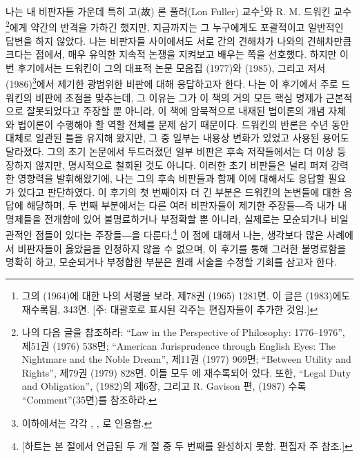 나는 내 비판자들 가운데 특히 고(故) 론 풀러(Lon Fuller)
교수\footnote{그의  (1964)에 대한 나의 서평을
  보라,  제78권 (1965) 1281면. 이 글은
   (1983)에도 재수록됨,
  343면. {[}주: 대괄호로 표시된 각주는 편집자들이 추가한 것임.{]}}와 R.
M. 드워킨 교수\footnote{나의 다음 글을 참조하라: ``Law in the
  Perspective of Philosophy: 1776--1976'',  제51권 (1976) 538면; ``American Jurisprudence through English
  Eyes: The Nightmare and the Noble Dream'', 
  제11권 (1977) 969면; ``Between Utility and Rights'',  제79권 (1979) 828면. 이들 모두 에 재수록되어 있다. 또한, ``Legal Duty
  and Obligation'',  (1982)의 제6장, 그리고 R.
  Gavison 편,  (1987) 수록
  ``Comment''(35면)를 참조하라.}에게 약간의 반격을 가하긴 했지만,
지금까지는 그 누구에게도 포괄적이고 일반적인 답변을 하지 않았다. 나는
비판자들 사이에서도 서로 간의 견해차가 나와의 견해차만큼 크다는 점에서,
매우 유익한 지속적 논쟁을 지켜보고 배우는 쪽을 선호했다. 하지만 이번
후기에서는 드워킨이 그의 대표적 논문 모음집  (1977)와  (1985), 그리고 저서
 (1986)\footnote{이하에서는 각각 ,
  , 로 인용함.}에서 제기한 광범위한 비판에 대해
응답하고자 한다. 나는 이 후기에서 주로 드워킨의 비판에 초점을 맞추는데,
그 이유는 그가 이 책의 거의 모든 핵심 명제가 근본적으로 잘못되었다고
주장할 뿐 아니라, 이 책에 암묵적으로 내재된 법이론의 개념 자체와
법이론이 수행해야 할 역할 전체를 문제 삼기 때문이다. 드워킨의 반론은
수년 동안 대체로 일관된 틀을 유지해 왔지만, 그 중 일부는 내용상 변화가
있었고 사용된 용어도 달라졌다. 그의 초기 논문에서 두드러졌던 일부 비판은
후속 저작들에서는 더 이상 등장하지 않지만, 명시적으로 철회된 것도
아니다. 이러한 초기 비판들은 널리 퍼져 강력한 영향력을 발휘해왔기에,
나는 그의 후속 비판들과 함께 이에 대해서도 응답할 필요가 있다고
판단하였다. 이 후기의 첫 번째이자 더 긴 부분은 드워킨의 논변들에 대한
응답에 해당하며, 두 번째 부분에서는 다른 여러 비판자들이 제기한
주장들―즉 내가 내 명제들을 전개함에 있어 불명료하거나 부정확할 뿐
아니라, 실제로는 모순되거나 비일관적인 점들이 있다는 주장들―을
다룬다.\footnote{{[}하트는 본 절에서 언급된 두 개 절 중 두 번째를
  완성하지 못함. 편집자 주 참조.{]}} 이 점에 대해서 나는, 생각보다 많은
사례에서 비판자들이 옳았음을 인정하지 않을 수 없으며, 이 후기를 통해
그러한 불명료함을 명확히 하고, 모순되거나 부정합한 부분은 원래 서술을
수정할 기회를 삼고자 한다.

